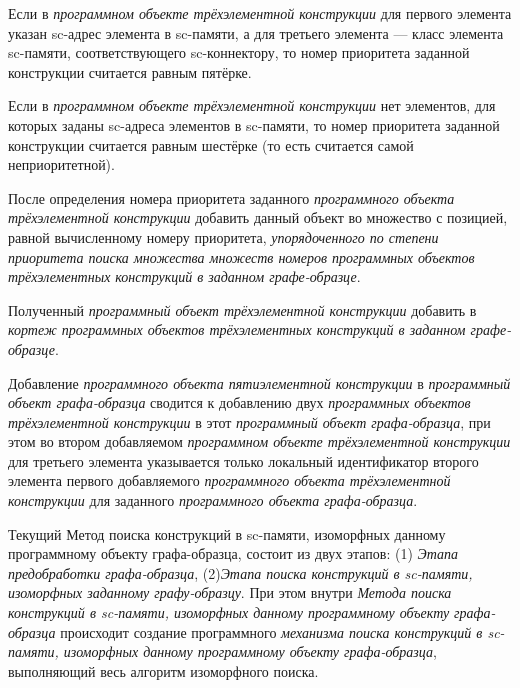 \begin{textitemize}
\begin{textitemize}
		\item Если в \textit{программном объекте трёхэлементной конструкции} для первого элемента указан sc-адрес элемента в sc-памяти, а для третьего элемента --- класс элемента sc-памяти, соответствующего sc-коннектору, то номер приоритета заданной конструкции считается равным пятёрке.
		\item Если в \textit{программном объекте трёхэлементной конструкции} нет элементов, для которых заданы sc-адреса элементов в sc-памяти, то номер приоритета заданной конструкции считается равным шестёрке (то есть считается самой неприоритетной).
	\end{textitemize}
	После определения номера приоритета заданного \textit{программного объекта трёхэлементной конструкции} добавить данный объект во множество с позицией, равной вычисленному номеру приоритета, \textit{упорядоченного по степени приоритета поиска множества множеств номеров программных объектов трёхэлементных конструкций в заданном графе-образце}.
	\item Полученный \textit{программный объект трёхэлементной конструкции} добавить в \textit{кортеж программных объектов трёхэлементных конструкций в заданном графе-образце}.
\end{textitemize}

Добавление \textit{программного объекта пятиэлементной конструкции} в \textit{программный объект графа-образца} сводится к добавлению двух \textit{программных объектов трёхэлементной конструкции} в этот \textit{программный объект графа-образца}, при этом во втором добавляемом \textit{программном объекте трёхэлементной конструкции} для третьего элемента указывается только локальный идентификатор второго элемента первого добавляемого \textit{программного объекта трёхэлементной конструкции} для заданного \textit{программного объекта графа-образца}.

Текущий Метод поиска конструкций в sc-памяти, изоморфных данному программному объекту графа-образца, состоит из двух этапов: (1) \textit{Этапа предобработки графа-образца}, (2)\textit{Этапа поиска конструкций в sc-памяти, изоморфных заданному графу-образцу}. При этом внутри \textit{Метода поиска конструкций в sc-памяти, изоморфных данному программному объекту графа-образца} происходит создание программного \textit{механизма поиска конструкций в sc-памяти, изоморфных данному программному объекту графа-образца}, выполняющий весь алгоритм изоморфного поиска.

